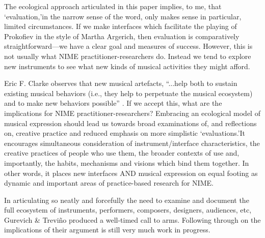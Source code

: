 The ecological approach articulated in this paper implies, to me, that \lq evaluation,\rq in the narrow sense of the word, only makes sense in particular, limited circumstances.  If we make interfaces which facilitate the playing of Prokofiev in the style of Martha Argerich, then evaluation is comparatively straightforward---we have a clear goal and measures of success.  However, this is not usually what NIME practitioner-researchers do.  Instead we tend to explore new instruments to see what new kinds of musical activities they might afford.

Eric F. Clarke observes that new musical artefacts, ``...help both to sustain existing musical behaviors (i.e., they help to perpetuate the musical ecosystem) and to make new behaviors possible'' \cite{Clarke:2005}.  If we accept this, what are the implications for NIME practitioner-researchers?  Embracing an ecological model of musical expression should lead us towards broad examinations of, and reflections on, creative practice and reduced emphasis on more simplistic \lq evaluations.\rq  It encourages simultaneous consideration of instrument/interface characteristics, the creative practices of people who use them, the broader contexts of use and, importantly, the habits, mechanisms and visions which bind them together.  In other words, it places new interfaces AND musical expression on equal footing as dynamic and important areas of practice-based research for NIME.

In articulating so neatly and forcefully the need to examine and document the full ecosystem of instruments, performers, composers, designers, audiences, etc, Gurevich \& Trevi\~{n}o produced a well-timed call to arms.  Following through on the implications of their argument is still very much work in progress.

